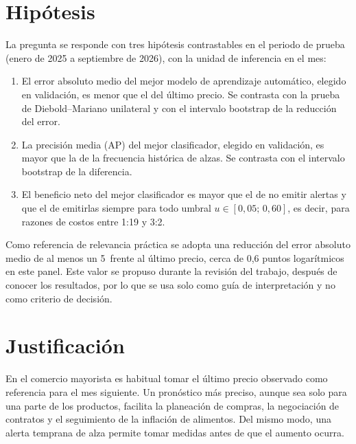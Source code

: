\section{Hipótesis}
\label{sec:hipotesis}

La pregunta se responde con tres hipótesis contrastables en el periodo de prueba (enero de 2025 a septiembre de 2026), con la unidad de inferencia en el mes:
\begin{enumerate}[label=H\arabic*.,nosep]
\item El error absoluto medio del mejor modelo de aprendizaje automático, elegido en validación, es menor que el del último precio. Se contrasta con la prueba de Diebold--Mariano unilateral y con el intervalo bootstrap de la reducción del error.
\item La precisión media (AP) del mejor clasificador, elegido en validación, es mayor que la de la frecuencia histórica de alzas. Se contrasta con el intervalo bootstrap de la diferencia.
\item El beneficio neto del mejor clasificador es mayor que el de no emitir alertas y que el de emitirlas siempre para todo umbral $u\in[0{,}05;\,0{,}60]$, es decir, para razones de costos entre 1:19 y 3:2.
\end{enumerate}
Como referencia de relevancia práctica se adopta una reducción del error absoluto medio de al menos un 5\pct\ frente al último precio, cerca de 0,6 puntos logarítmicos en este panel. Este valor se propuso durante la revisión del trabajo, después de conocer los resultados, por lo que se usa solo como guía de interpretación y no como criterio de decisión.

\section{Justificación}

En el comercio mayorista es habitual tomar el último precio observado como referencia para el mes siguiente. Un pronóstico más preciso, aunque sea solo para una parte de los productos, facilita la planeación de compras, la negociación de contratos y el seguimiento de la inflación de alimentos. Del mismo modo, una alerta temprana de alza permite tomar medidas antes de que el aumento ocurra.

